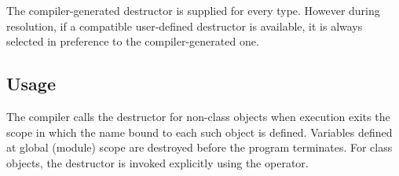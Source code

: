 The compiler-generated destructor is supplied for every type.  However during
resolution, if a compatible user-defined destructor is available, it is always
selected in preference to the compiler-generated one.

\subsection{Usage}

The compiler calls the destructor for non-class objects when execution exits the
scope in which the name bound to each such object is defined.  Variables defined
at global (module) scope are destroyed before the program terminates.  For class
objects, the destructor is invoked explicitly using the  operator.




